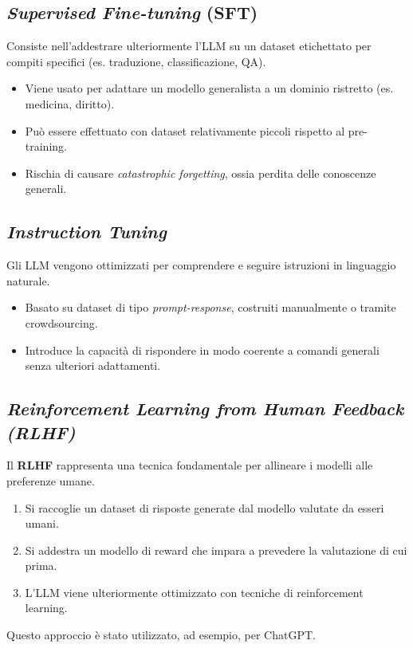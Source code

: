 \subsection{\textit{Supervised Fine-tuning} (SFT)}
Consiste nell'addestrare ulteriormente l'LLM su un dataset etichettato per compiti specifici (es. traduzione, classificazione, QA).
\begin{itemize}
    \item Viene usato per adattare un modello generalista a un dominio ristretto (es. medicina, diritto).
    \item Può essere effettuato con dataset relativamente piccoli rispetto al pre-training.
    \item Rischia di causare \textit{catastrophic forgetting}, ossia perdita delle conoscenze generali.
\end{itemize}

\subsection{\textit{Instruction Tuning}}
Gli LLM vengono ottimizzati per comprendere e seguire istruzioni in linguaggio naturale.
\begin{itemize}
    \item Basato su dataset di tipo \textit{prompt-response}, costruiti manualmente o tramite crowdsourcing.
    \item Introduce la capacità di rispondere in modo coerente a comandi generali senza ulteriori adattamenti.
\end{itemize}
\cite{chung2022scaling}

\subsection{\textit{Reinforcement Learning from Human Feedback (RLHF)}}
Il \textbf{RLHF} \cite{ziegler2019fine} rappresenta una tecnica fondamentale per allineare i modelli alle preferenze umane.
\begin{enumerate}
    \item Si raccoglie un dataset di risposte generate dal modello valutate da esseri umani.
    \item Si addestra un modello di reward che impara a prevedere la valutazione di cui prima.
    \item L'LLM viene ulteriormente ottimizzato con tecniche di reinforcement learning.
\end{enumerate}
Questo approccio è stato utilizzato, ad esempio, per ChatGPT.

